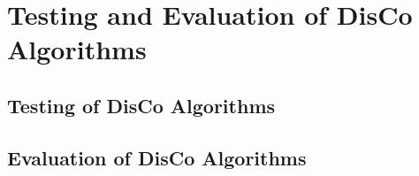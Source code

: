 \section{Testing and Evaluation of DisCo Algorithms}
\label{sec:testing_and_evaluation_of_disco_algorithms}

\subsection{Testing of DisCo Algorithms}
\label{sec:testing_of_disco_algorithms}


\subsection{Evaluation of DisCo Algorithms}
\label{sec:evaluation_of_disco_algorithms}

